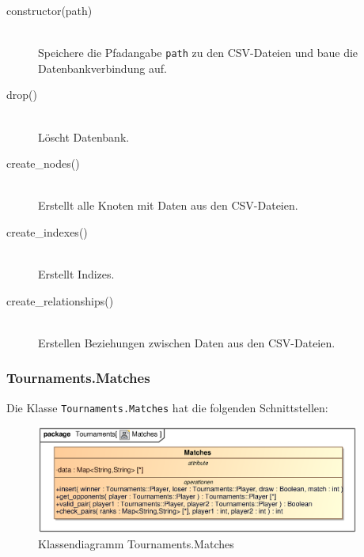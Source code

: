 \begin{description}
    \item[constructor(path)] \hfill \\
    Speichere die Pfadangabe \verb|path| zu den \ac{CSV}-Dateien und baue die Datenbankverbindung auf.
    
    \item[drop()] \hfill \\
    Löscht Datenbank.
    
    \item[create\_nodes()] \hfill \\
    Erstellt alle Knoten mit Daten aus den \ac{CSV}-Dateien.
    
    \item[create\_indexes()] \hfill \\
    Erstellt Indizes.
    
    \item[create\_relationships()] \hfill \\
    Erstellen Beziehungen zwischen Daten aus den \ac{CSV}-Dateien.
\end{description}


\subsubsection{Tournaments.Matches}
Die Klasse \verb|Tournaments.Matches| hat die folgenden Schnittstellen:

\begin{figure}[H]
    \myfloatalign
    \includegraphics[width=0.95\textwidth]{gfx/MtGDeepAnalysis/Matches.eps}
    \caption{Klassendiagramm Tournaments.Matches}
    \label{fig:class:Tournaments.Matches}
\end{figure}

